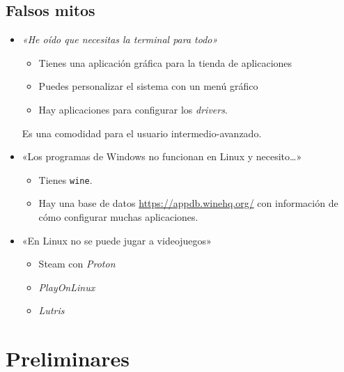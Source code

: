 \documentclass[aspectratio=43]{beamer}
\begin{document}
    \subsection{Falsos mitos}
    \begin{frame}[fragile]{\subsecname}{\secname}
        \begin{itemize}
            \item \textit{«He oído que necesitas la terminal para todo»}
            \pause
            \begin{itemize}
                \item Tienes una aplicación gráfica para la tienda de aplicaciones
                \item Puedes personalizar el sistema con un menú gráfico
                \item Hay aplicaciones para configurar los \textit{drivers}.
            \end{itemize}
            Es una comodidad para el usuario intermedio-avanzado.
            \item «Los programas de Windows no funcionan en Linux y necesito\ldots»
            \pause
            \begin{itemize}
                \item Tienes \verb!wine!.
                \item Hay una base de datos
                    \href{(WineHQ)}{https://appdb.winehq.org/} con información
                    de cómo configurar muchas aplicaciones.
            \end{itemize}
            \item «En Linux no se puede jugar a videojuegos»
            \pause
            \begin{itemize}
                \item Steam con \textit{Proton}
                \item \textit{PlayOnLinux}
                \item \textit{Lutris}
            \end{itemize}
        \end{itemize}
    \end{frame}

    \section{Preliminares}
\end{document}
